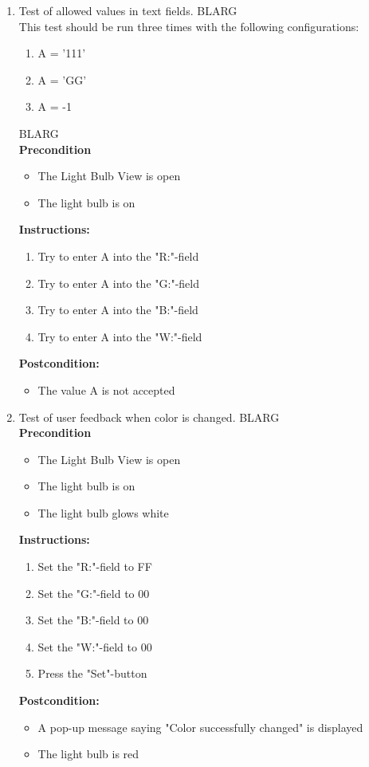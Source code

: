 \documentclass[a4paper]{article}
\newlength{\testlabellength}
\newenvironment{testlist}{\begin{enumerate}[label=\bfseries Instruction \thesubsection.\arabic* , labelindent=0pt, labelwidth=\testlabellength , leftmargin=2cm]}{\end{enumerate}}
\newenvironment{config}[1][2]{
{\color{white}BLARG}\\ 
This test should be run #1 times with the following configurations:
\begin{enumerate}[label=\bfseries  \arabic*., labelindent=0cm, labelwidth=2cm , leftmargin=1cm]
}
{\end{enumerate}}
\newenvironment{precondition}{
{\color{white}BLARG}\\ 
\textbf{Precondition}
\begin{itemize}[labelindent=0cm, labelwidth=2cm , leftmargin=1cm]
}
{\end{itemize}}
\newenvironment{instruction}{
\textbf{Instructions:}
\begin{enumerate}[label=\bfseries  \arabic*., labelindent=0cm, labelwidth=2cm , leftmargin=1cm]
}
{\end{enumerate}}
\newenvironment{postcondition}{
\textbf{Postcondition:}
\begin{itemize}[labelindent=0cm, labelwidth=2cm , leftmargin=1cm]
}
{\end{itemize}}
\begin{document}
\begin{appendices}
\begin{testlist}
	\item Test of allowed values in text fields.
		\begin{config}[three]
			\item A = '111'
			\item A = 'GG' 
			\item A = -1
		\end{config}
		\begin{precondition}
			\item The Light Bulb View is open
			\item The light bulb is on
		\end{precondition}
		\begin{instruction}
			\item Try to enter A into the "R:"-field
			\item Try to enter A into the "G:"-field
			\item Try to enter A into the "B:"-field
			\item Try to enter A into the "W:"-field
		\end{instruction}
		\begin{postcondition}
			\item The value A is not accepted
		\end{postcondition}
\newpage

	\item Test of user feedback when color is changed.
		\begin{precondition}
			\item The Light Bulb View is open
			\item The light bulb is on
			\item The light bulb glows white
		\end{precondition}
		\begin{instruction}
			\item Set the "R:"-field to FF
			\item Set the "G:"-field to 00
			\item Set the "B:"-field to 00
			\item Set the "W:"-field to 00
			\item Press the "Set"-button
		\end{instruction}
		\begin{postcondition}
			\item A pop-up message saying "Color successfully changed" is displayed
			\item The light bulb is red
		\end{postcondition}


\end{testlist}
\end{appendices}
\end{document}
